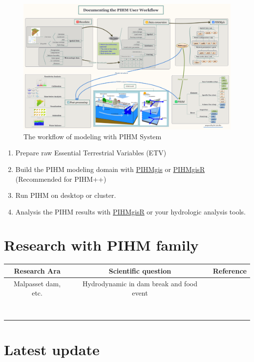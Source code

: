 \documentclass[]{scrbook}
\providecommand{\tightlist}{%
  \setlength{\itemsep}{0pt}\setlength{\parskip}{0pt}}
\begin{document}
\begin{figure}
\centering
\includegraphics{./Fig/Workflow.png}
\caption{The workflow of modeling with PIHM System}
\end{figure}

\begin{enumerate}
\def\labelenumi{\arabic{enumi}.}
\tightlist
\item
  Prepare raw Essential Terrestrial Variables (ETV)
\item
  Build the PIHM modeling domain with
  \href{http://www.pihm.psu.edu/pihmgis_home.html}{PIHMgis} or
  \href{https://github.com/shulele/PIHMgisR}{PIHMgisR} (Recommended for
  PIHM++)
\item
  Run PIHM on desktop or cluster.
\item
  Analysis the PIHM results with
  \href{https://github.com/shulele/PIHMgisR}{PIHMgisR} or your
  hydrologic analysis tools.
\end{enumerate}

\section{Research with PIHM family}\label{research-with-pihm-family}

\begin{longtable}[]{@{}ccc@{}}
\toprule
Research Ara & Scientific question & Reference\tabularnewline
\midrule
\endhead
Malpasset dam, etc. & Hydrodynamic in dam break and food event &
\citep{Li2011}\tabularnewline
& &\tabularnewline
& &\tabularnewline
& &\tabularnewline
& &\tabularnewline
& &\tabularnewline
& &\tabularnewline
& &\tabularnewline
& &\tabularnewline
\bottomrule
\end{longtable}

\section{Latest update}\label{latest-update}
\end{document}
